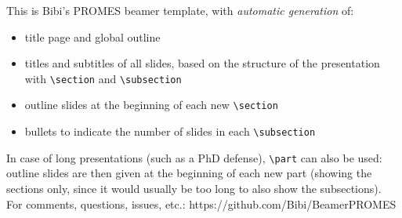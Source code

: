 \documentclass[9pt,english]{Beamer_PROMES}\uselanguage{English}\languagepath{English}
\begin{document}
\begin{frame}[fragile]%

This is Bibi's PROMES beamer template, with \emph{automatic generation} of:
%
\begin{itemize}
   \item title page and global outline
   \item titles and subtitles of all slides, based on the structure of the presentation with \verb=\section= and \verb=\subsection=
   \item outline slides at the beginning of each new \verb=\section=
   \item bullets to indicate the number of slides in each \verb=\subsection=
\end{itemize}
%
In case of long presentations (such as a PhD defense), \verb=\part= can also be used: outline slides are then given at the beginning of each new part (showing the sections only, since it would usually be too long to also show the subsections).\\[1cm]

For comments, questions, issues, etc.: https://github.com/Bibi/BeamerPROMES

\end{frame}
\end{document}
